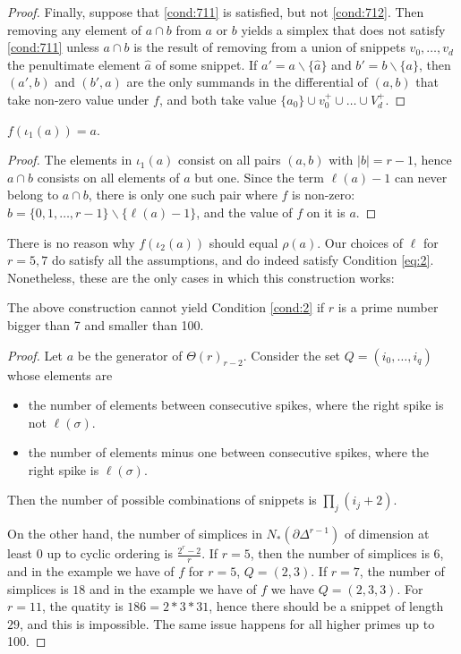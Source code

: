 \begin{proof}
	Finally, suppose that \eqref{cond:711} is satisfied, but not \eqref{cond:712}. Then removing any element of $a\cap b$ from $a$ or $b$ yields a simplex that does not satisfy \eqref{cond:711} unless $a\cap b$ is the result of removing from a union of snippets $v_0,\ldots,v_d$ the penultimate element $\hat{a}$ of some snippet. If $a' = a\smallsetminus \{\hat{a}\}$ and $b' = b\smallsetminus \{a\}$, then $(a',b)$ and $(b',a)$ are the only summands in the differential of $(a,b)$ that take non-zero value under $f$, and both take value $\{a_0\}\cup v_0^+\cup \ldots \cup V_d^+$.
\end{proof}

\begin{lemma}
	$f(\iota_1(a)) = a$.
\end{lemma}

\begin{proof}
	The elements in $\iota_1(a)$ consist on all pairs $(a,b)$ with $|b|=r-1$, hence $a\cap b$ consists on all elements of $a$ but one. Since the term $\ell(a)-1$ can never belong to $a\cap b$, there is only one such pair where $f$ is non-zero: $b = \{0,1,\ldots,r-1\}\smallsetminus \{\ell(a)-1\}$, and the value of $f$ on it is $a$.
\end{proof}

\begin{remark}
	There is no reason why $f(\iota_2(a))$ should equal $\rho(a)$. Our choices of $\ell$ for $r=5,7$ do satisfy all the assumptions, and do indeed satisfy Condition \eqref{eq:2}. Nonetheless, these are the only cases in which this construction works:
\end{remark}

\begin{lemma}
	The above construction cannot yield Condition \eqref{cond:2} if $r$ is a prime number bigger than 7 and smaller than 100.
\end{lemma}

\begin{proof}
	Let $a$ be the generator of $\Theta(r)_{r-2}$. Consider the set $Q=(i_0,\ldots,i_q)$ whose elements are
	\begin{itemize}
		\item the number of elements between consecutive spikes, where the right spike is not $\ell(\sigma)$.
		\item the number of elements minus one between consecutive spikes, where the right spike is $\ell(\sigma)$.
	\end{itemize}
	Then the number of possible combinations of snippets is $\prod_j{(i_j+2)}$.

	On the other hand, the number of simplices in $N_*(\partial\Delta^{r-1})$ of dimension at least $0$ up to cyclic ordering is $\frac{2^r-2}{r}$. If $r=5$, then the number of simplices is $6$, and in the example we have of $f$ for $r=5$, $Q=(2,3)$. If $r=7$, the number of simplices is $18$ and in the example we have of $f$ we have $Q=(2,3,3)$. For $r=11$, the quatity is $186 = 2*3*31$, hence there should be a snippet of length $29$, and this is impossible. The same issue happens for all higher primes up to 100.
\end{proof}

